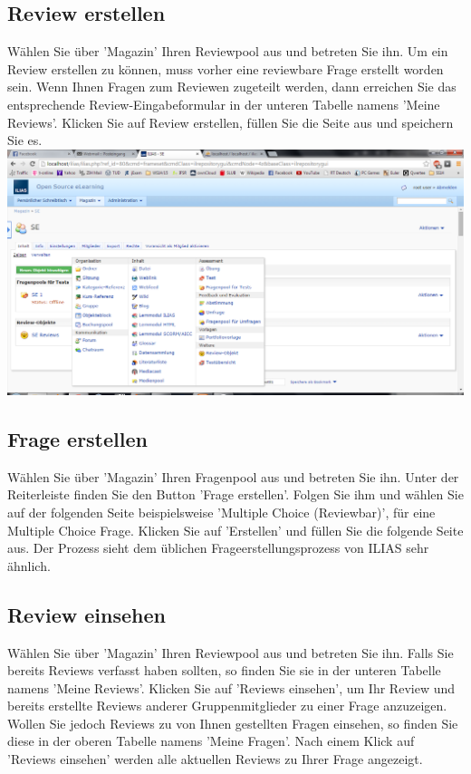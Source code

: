 \documentclass[12pt,a4paper]{scrreprt}
\begin{document}
\subsection{Review erstellen}
Wählen Sie über 'Magazin' Ihren Reviewpool aus und betreten Sie ihn. Um ein Review erstellen zu können, muss vorher eine reviewbare Frage erstellt worden sein. Wenn Ihnen Fragen zum Reviewen zugeteilt werden, dann erreichen Sie das entsprechende Review-Eingabeformular in der unteren Tabelle namens 'Meine Reviews'. Klicken Sie auf Review erstellen, füllen Sie die Seite aus und speichern Sie es. \\		
\includegraphics[width=1.0\textwidth]{reviewpool_erstellen.png}
		
\subsection{Frage erstellen}
Wählen Sie über 'Magazin' Ihren Fragenpool aus und betreten Sie ihn. Unter der Reiterleiste finden Sie den Button 'Frage erstellen'. Folgen Sie ihm und wählen Sie auf der folgenden Seite beispielsweise 'Multiple Choice (Reviewbar)', für eine Multiple Choice Frage. Klicken Sie auf 'Erstellen' und füllen Sie die folgende Seite aus. Der Prozess sieht dem üblichen Frageerstellungsprozess von ILIAS sehr ähnlich. 
		
\subsection{Review einsehen}
Wählen Sie über 'Magazin' Ihren Reviewpool aus und betreten Sie ihn. Falls Sie bereits Reviews verfasst haben sollten, so finden Sie sie in der unteren Tabelle namens 'Meine Reviews'. Klicken Sie auf 'Reviews einsehen', um Ihr Review und bereits erstellte Reviews anderer Gruppenmitglieder zu einer Frage anzuzeigen. Wollen Sie jedoch Reviews zu von Ihnen gestellten Fragen einsehen, so finden Sie diese in der oberen Tabelle namens 'Meine Fragen'. Nach einem Klick auf 'Reviews einsehen' werden alle aktuellen Reviews zu Ihrer Frage angezeigt.
		
\end{document}
